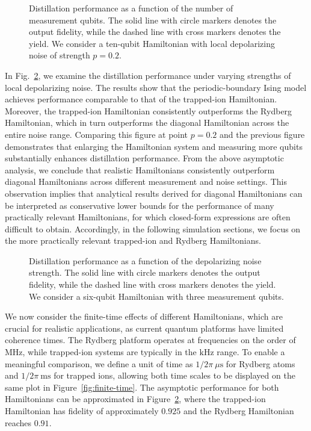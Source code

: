 \documentclass[onecolumn,prx,longbibliography,nofootinbib, superscriptaddress]{revtex4-2}
\theoremstyle{recap}
\begin{document}
\begin{figure}[htbp]
    \centering
    
    \caption{Distillation performance as a function of the number of measurement qubits. The solid line with circle markers denotes the output fidelity, while the dashed line with cross markers denotes the yield. We consider a ten-qubit Hamiltonian with local depolarizing noise of strength $p=0.2$.}
    \label{fig:F-Y-m}
\end{figure}

In Fig.~\ref{fig:F-Y-noise}, we examine the distillation performance under varying strengths of local depolarizing noise. The results show that the periodic-boundary Ising model achieves performance comparable to that of the trapped-ion Hamiltonian. Moreover, the trapped-ion Hamiltonian consistently outperforms the Rydberg Hamiltonian, which in turn outperforms the diagonal Hamiltonian across the entire noise range. Comparing this figure at point $p=0.2$ and the previous figure demonstrates that enlarging the Hamiltonian system and measuring more qubits substantially enhances distillation performance. From the above asymptotic analysis, we conclude that realistic Hamiltonians consistently outperform diagonal Hamiltonians across different measurement and noise settings. This observation implies that analytical results derived for diagonal Hamiltonians can be interpreted as conservative lower bounds for the performance of many practically relevant Hamiltonians, for which closed-form expressions are often difficult to obtain. Accordingly, in the following simulation sections, we focus on the more practically relevant trapped-ion and Rydberg Hamiltonians.

\begin{figure}[htbp]
    \centering
    
    \caption{Distillation performance as a function of the depolarizing noise strength. The solid line with circle markers denotes the output fidelity, while the dashed line with cross markers denotes the yield. We consider a six-qubit Hamiltonian with three measurement qubits.}
    \label{fig:F-Y-noise}
\end{figure}

We now consider the finite-time effects of different Hamiltonians, which are crucial for realistic applications, as current quantum platforms have limited coherence times. The Rydberg platform operates at frequencies on the order of $\mathrm{MHz}$, while trapped-ion systems are typically in the $\mathrm{kHz}$ range. To enable a meaningful comparison, we define a unit of time as $1/2\pi~\mu\mathrm{s}$ for Rydberg atoms and $1/2\pi~\mathrm{ms}$ for trapped ions, allowing both time scales to be displayed on the same plot in Figure~\ref{fig:finite-time}. 
The asymptotic performance for both Hamiltonians can be approximated in Figure~\ref{fig:F-Y-noise}, where the trapped-ion Hamiltonian has fidelity of approximately $0.925$ and the Rydberg Hamiltonian reaches $0.91$.
\end{document}
